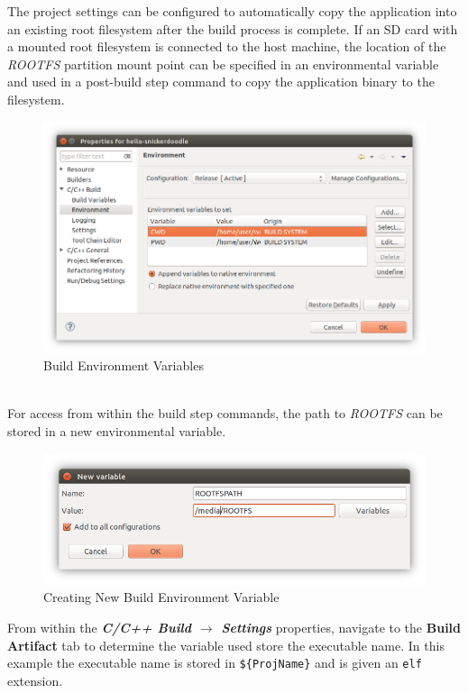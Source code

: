 The project settings can be configured to automatically copy the application into an existing root filesystem after the build process is complete. If an SD card with a mounted root filesystem is connected to the host machine, the location of the \textit{ROOTFS} partition mount point can be specified in an environmental variable and used in a post-build step command to copy the application binary to the filesystem. \\


\begin{figure}[h]
	\centering
	\includegraphics{images/Build_Environment.png}
	\caption{Build Environment Variables}
	\label{fig:buildenv}
\end{figure}


~\\
\noindent
For access from within the build step commands, the path to \textit{ROOTFS} can be stored in a new environmental variable. \\

\begin{figure}[h]
	\centering
	\includegraphics{images/New_Variable.png}
	\caption{Creating New Build Environment Variable}
\end{figure}



\noindent
From within the \textit{\bfseries C/C++ Build $\rightarrow$ Settings} properties, navigate to the \textbf{Build Artifact} tab to determine the variable used store the executable name. In this example the executable name is stored in \Verb|${ProjName}| and is given an \texttt{elf} extension.

